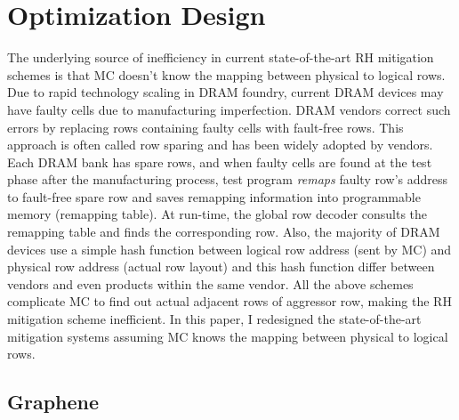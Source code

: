 \chapter{Optimization Design} \label{sec:Optimization}
The underlying source of inefficiency in current state-of-the-art RH mitigation schemes is that MC doesn't know
the mapping between physical to logical rows. Due to rapid technology scaling in DRAM foundry, current DRAM devices
may have faulty cells due to manufacturing imperfection. DRAM vendors correct such errors by replacing rows containing 
faulty cells with fault-free rows. This approach is often called row sparing and has been widely adopted by vendors. 
Each DRAM bank has spare rows, and when faulty cells are found at the test phase after the manufacturing process, test program \textit{remaps} 
faulty row's address to fault-free spare row and saves remapping information into programmable memory (remapping table). At run-time, 
the global row decoder consults the remapping table and finds the corresponding row. Also, the majority of DRAM devices use a simple hash 
function between logical row address (sent by MC) and physical row address (actual row layout) and this hash function 
differ between vendors and even products within the same vendor. 
All the above schemes complicate MC to find out actual adjacent rows of aggressor row, making the RH mitigation scheme inefficient. 
In this paper, I redesigned the state-of-the-art mitigation systems assuming MC knows the mapping between physical to logical rows.

\section{Graphene}
